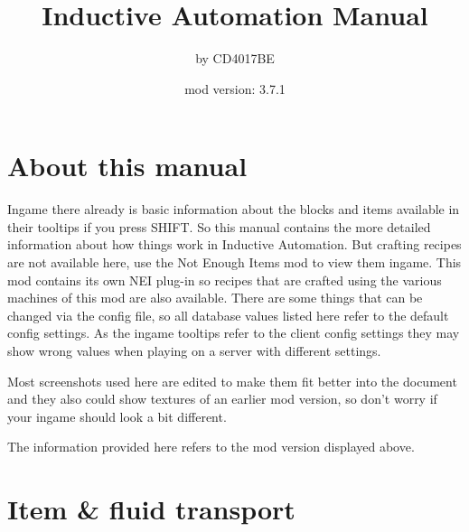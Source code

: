 \documentclass[11pt]{article} %
\title{Inductive Automation Manual}
\author{by CD4017BE}
\date{mod version: 3.7.1}
\begin{document}
 \maketitle
 \tableofcontents
 
 \section{About this manual}  
  Ingame there already is basic information about the blocks and items available in their tooltips if you press SHIFT. So this manual contains the more detailed information about how things work in Inductive Automation. But crafting recipes are not available here, use the Not Enough Items mod to view them ingame. This mod contains its own NEI plug-in so recipes that are crafted using the various machines of this mod are also available. There are some things that can be changed via the config file, so all database values listed here refer to the default config settings. As the ingame tooltips refer to the client config settings they may show wrong values when playing on a server with different settings.

Most screenshots used here are edited to make them fit better into the document and they also could show textures of an earlier mod version, so don't worry if your ingame should look a bit different. 

The information provided here refers to the mod version displayed above.

\newpage
\section{Item \& fluid transport}
\end{document}
